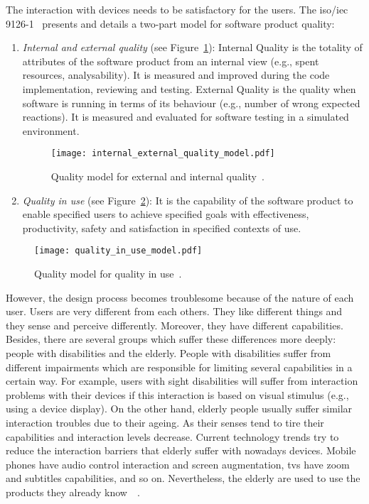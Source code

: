 The interaction with devices needs to be satisfactory for the users. The 
\acs{iso}/\acs{iec} 9126-1~\citep{isoiec1} presents and details a two-part model 
for software product quality:

\begin{enumerate}
  \item \textit{Internal and external quality} (see Figure~\ref{fig:ie_q_model}):
  Internal Quality is the totality of attributes of the software product from an
  internal view (e.g., spent resources, analysability). It is measured and
  improved during the code implementation, reviewing and testing. External 
  Quality is the quality when software is running in terms of its behaviour 
  (e.g., number of wrong expected reactions). It is measured and evaluated for 
  software testing in a simulated environment.
  
\begin{figure}[H]
\centering
\texttt{[image: internal\_external\_quality\_model.pdf]}
\caption{Quality model for external and internal quality~\citep{isoiec1}.}
\label{fig:ie_q_model}
\end{figure}
  
  \item \textit{Quality in use} (see Figure~\ref{fig:qu_model}): It is the capability of
  the software product to enable specified users to achieve specified goals with
  effectiveness, productivity, safety and satisfaction in specified contexts of
  use.
\end{enumerate}


\begin{figure}[H]
\centering
\texttt{[image: quality\_in\_use\_model.pdf]}
\caption{Quality model for quality in use~\citep{isoiec1}.}
\label{fig:qu_model}
\end{figure}

However, the design process becomes troublesome because of the nature of each
user. Users are very different from each others. They like different things and they
sense and perceive differently. Moreover, they have different capabilities.
Besides, there are several groups which suffer these differences more deeply:
people with disabilities and the elderly. People with disabilities suffer from 
different impairments which are responsible for limiting several capabilities 
in a certain way. For example, users with sight disabilities will suffer from 
interaction problems with their devices if this interaction is based on visual 
stimulus (e.g., using a device display). On the other hand, elderly people 
usually suffer similar interaction troubles due to their ageing. As their 
senses tend to tire their capabilities and interaction levels decrease. Current 
technology trends try to reduce the interaction barriers that elderly suffer 
with nowadays devices. Mobile phones have audio control interaction and screen 
augmentation, \acsp{tv} have zoom and subtitles capabilities, and so on. 
Nevertheless, the elderly are used to use the products they already 
know~\citep{roupa_use_2010}~\citep{elderly_tech}.

